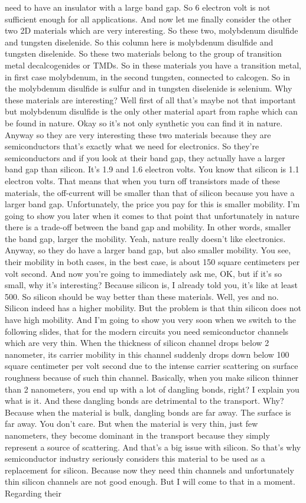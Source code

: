 need to have an insulator with a large band gap. So 6 electron volt is not sufficient enough for all applications. And now let me finally consider the other two 2D materials which are very interesting. So these two, molybdenum disulfide and tungsten diselenide. So this column here is molybdenum disulfide and tungsten diselenide. So these two materials belong to the group of transition metal decalcogenides or TMDs. So in these materials you have a transition metal, in first case molybdenum, in the second tungsten, connected to calcogen. So in the molybdenum disulfide is sulfur and in tungsten diselenide is selenium. Why these materials are interesting? Well first of all that's maybe not that important but molybdenum disulfide is the only other material apart from raphe which can be found in nature. Okay so it's not only synthetic you can find it in nature. Anyway so they are very interesting these two materials because they are semiconductors that's exactly what we need for electronics. So they're semiconductors and if you look at their band gap, they actually have a larger band gap than silicon. It's 1.9 and 1.6 electron volts. You know that silicon is 1.1 electron volts. That means that when you turn off transistors made of these materials, the off-current will be smaller than that of silicon because you have a larger band gap. Unfortunately, the price you pay for this is smaller mobility. I'm going to show you later when it comes to that point that unfortunately in nature there is a trade-off between the band gap and mobility. In other words, smaller the band gap, larger the mobility. Yeah, nature really doesn't like electronics. Anyway, so they do have a larger band gap, but also smaller mobility. You see, their mobility in both cases, in the best case, is about 150 square centimeters per volt second. And now you're going to immediately ask me, OK, but if it's so small, why it's interesting? Because silicon is, I already told you, it's like at least 500. So silicon should be way better than these materials. Well, yes and no. Silicon indeed has a higher mobility. But the problem is that thin silicon does not have high mobility. And I'm going to show you very soon when we switch to the following slides, that for the modern circuits you need semiconductor channels which are very thin. When the thickness of silicon channel drops below 2 nanometer, its carrier mobility in this channel suddenly drops down below 100 square centimeter per volt second due to the intense carrier scattering on surface roughness because of such thin channel. Basically, when you make silicon thinner than 2 nanometers, you end up with a lot of dangling bonds, right? I explain you what is it. And these dangling bonds are detrimental to the transport. Why? Because when the material is bulk, dangling bonds are far away. The surface is far away. You don't care. But when the material is very thin, just few nanometers, they become dominant in the transport because they simply represent a source of scattering. And that's a big issue with silicon. So that's why semiconductor industry seriously considers this material to be used as a replacement for silicon. Because now they need thin channels and unfortunately thin silicon channels are not good enough. But I will come to that in a moment. Regarding their 